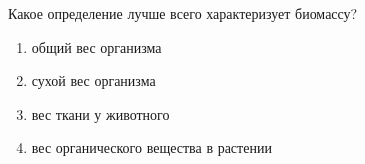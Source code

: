 
Какое определение лучше всего характеризует биомассу?

\begin{enumerate}
    \item общий вес организма
    \item сухой вес организма
    \item вес ткани у животного 
    \item вес органического вещества в растении
\end{enumerate}

